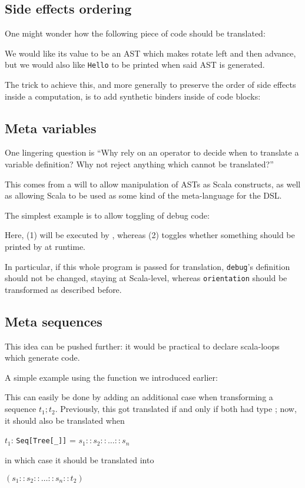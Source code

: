 \subsection{Side effects ordering}
One might wonder how the following piece of code should be translated:


We would like its value to be an AST which makes \rob{} rotate left and then advance,
but we would also like \texttt{Hello} to be printed when said AST is generated.

The trick to achieve this, and more generally to preserve the order of side effects inside a computation, is to add synthetic binders inside of code blocks:


\subsection{Meta variables}
One lingering question is 
``Why rely on an operator to decide when to translate a variable definition? 
Why not reject anything which cannot be translated?''

This comes from a will to allow manipulation of ASTs as Scala constructs, as well as allowing Scala to be used as some kind of the meta-language for the DSL. 

The simplest example is to allow toggling of debug code:

Here, (1) will be executed by \rob{}, whereas (2) toggles whether something should be printed by \rob{} at runtime.

In particular, if this whole program is passed for translation,
\lstinline{debug}'s definition should not be changed, staying at Scala-level, whereas \lstinline{orientation} should be transformed as described before.

\subsection{Meta sequences} \label{sec:meta-for}
This idea can be pushed further: 
it would be practical to declare scala-loops which generate code.

A simple example using the  function we introduced earlier:

This can easily be done by adding an additional case when transforming a sequence $t_1;t_2$.
Previously, this got translated if and only if both had type \treetype{};
now, it should also be translated when 
\begin{center}
    $t_1$: \lstinline{Seq[Tree[_]]} = $s_1 :: s_2 :: \ldots :: s_n$
\end{center}
in which case it should be translated into 
\begin{center}
    $(s_1 :: s_2 :: \ldots :: s_n :: t_2)$
\end{center}

